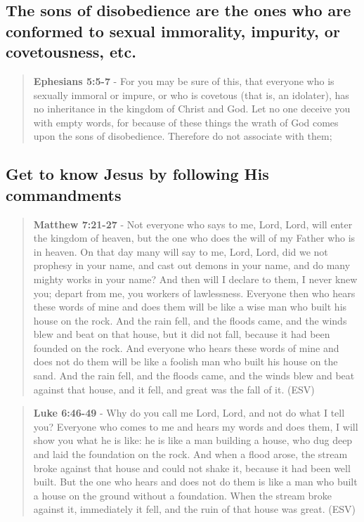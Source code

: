 \documentclass[11pt]{article}
\begin{document}
\subsection{The sons of disobedience are the ones who are conformed to sexual immorality, impurity, or covetousness, etc.}
\label{sec:orgeef16b6}
\begin{quote}
\textbf{Ephesians 5:5-7} - For you may be sure of this, that everyone who is sexually immoral or impure, or who is covetous (that is, an idolater), has no inheritance in the kingdom of Christ and God. Let no one deceive you with empty words, for because of these things the wrath of God comes upon the sons of disobedience. Therefore do not associate with them;
\end{quote}

\subsection{Get to know Jesus by following His commandments}
\label{sec:org8db7526}
\begin{quote}
\textbf{Matthew 7:21-27} - Not everyone who says to me, Lord, Lord, will enter the kingdom of heaven, but the one who does the will of my Father who is in heaven.  On that day many will say to me, Lord, Lord, did we not prophesy in your name, and cast out demons in your name, and do many mighty works in your name?  And then will I declare to them, I never knew you; depart from me, you workers of lawlessness.  Everyone then who hears these words of mine and does them will be like a wise man who built his house on the rock.  And the rain fell, and the floods came, and the winds blew and beat on that house, but it did not fall, because it had been founded on the rock.  And everyone who hears these words of mine and does not do them will be like a foolish man who built his house on the sand.  And the rain fell, and the floods came, and the winds blew and beat against that house, and it fell, and great was the fall of it. (ESV)
\end{quote}

\begin{quote}
\textbf{Luke 6:46-49} - Why do you call me Lord, Lord, and not do what I tell you? Everyone who comes to me and hears my words and does them, I will show you what he is like: he is like a man building a house, who dug deep and laid the foundation on the rock. And when a flood arose, the stream broke against that house and could not shake it, because it had been well built. But the one who hears and does not do them is like a man who built a house on the ground without a foundation. When the stream broke against it, immediately it fell, and the ruin of that house was great. (ESV)
\end{quote}
\end{document}
